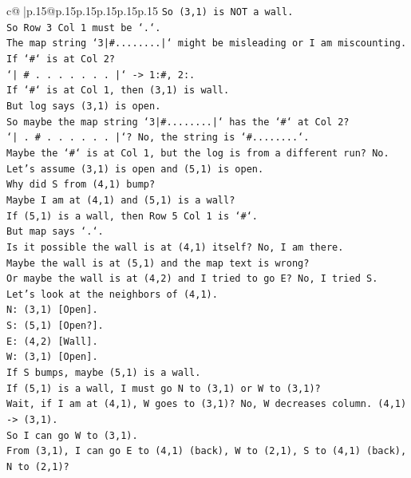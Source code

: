 \documentclass{article}
\begin{document}
{\begin{supertabular}{c@{$\;$}|p{.15\linewidth}@{}p{.15\linewidth}p{.15\linewidth}p{.15\linewidth}p{.15\linewidth}p{.15\linewidth}}
{{{\texttt{So (3,1) is NOT a wall.} \\
\texttt{So Row 3 Col 1 must be `.`.} \\
\texttt{The map string `3|\#........|` might be misleading or I am miscounting.} \\
\texttt{If `\#` is at Col 2?} \\
\texttt{`| \# . . . . . . . |` {-}> 1:\#, 2:.} \\
\texttt{If `\#` is at Col 1, then (3,1) is wall.} \\
\texttt{But log says (3,1) is open.} \\
\texttt{So maybe the map string `3|\#........|` has the `\#` at Col 2?} \\
\texttt{`| . \# . . . . . . |`? No, the string is `\#........`.} \\
\texttt{Maybe the `\#` is at Col 1, but the log is from a different run? No.} \\
\texttt{Let's assume (3,1) is open and (5,1) is open.} \\
\texttt{Why did S from (4,1) bump?} \\
\texttt{Maybe I am at (4,1) and (5,1) is a wall?} \\
\texttt{If (5,1) is a wall, then Row 5 Col 1 is `\#`.} \\
\texttt{But map says `.`.} \\
\texttt{Is it possible the wall is at (4,1) itself? No, I am there.} \\
\texttt{Maybe the wall is at (5,1) and the map text is wrong?} \\
\texttt{Or maybe the wall is at (4,2) and I tried to go E? No, I tried S.} \\
\texttt{Let's look at the neighbors of (4,1).} \\
\texttt{N: (3,1) {[}Open{]}.} \\
\texttt{S: (5,1) {[}Open?{]}.} \\
\texttt{E: (4,2) {[}Wall{]}.} \\
\texttt{W: (3,1) {[}Open{]}.} \\
\texttt{If S bumps, maybe (5,1) is a wall.} \\
\texttt{If (5,1) is a wall, I must go N to (3,1) or W to (3,1)?} \\
\texttt{Wait, if I am at (4,1), W goes to (3,1)? No, W decreases column. (4,1) {-}> (3,1).} \\
\texttt{So I can go W to (3,1).} \\
\texttt{From (3,1), I can go E to (4,1) (back), W to (2,1), S to (4,1) (back), N to (2,1)?} \\
}}}
\end{supertabular}}
\end{document}
